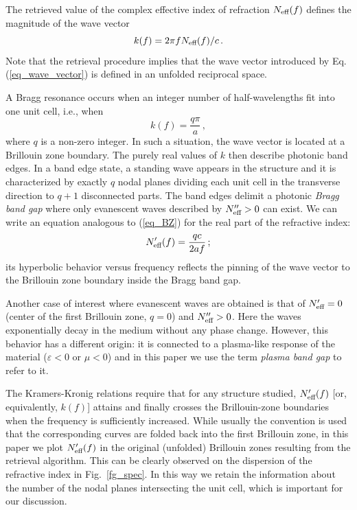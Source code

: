 {The retrieved value of the complex effective index of refraction $N_{\text{eff} }(f)$ 
defines the
magnitude of the wave vector
\begin{equation}\label{eq_wave_vector}
k(f) = 2\pi f N_{\text{eff} }(f) /c\,.
\end{equation}
Note that the retrieval procedure  implies that 
the wave vector
introduced by Eq. (\ref{eq_wave_vector}) is defined in an unfolded reciprocal 
space. 

A Bragg resonance occurs when an integer number of half-wavelengths fit into one 
unit cell, i.e.,  when
\begin{equation}\label{eq_BZ}
k(f) = \frac{q \pi}{a}\,,
\end{equation}
where $q$ is a non-zero integer. In such a situation, the wave vector is located at a
Brillouin zone boundary. The purely real values of $k$ then describe photonic band edges.
In a band edge state, a standing wave appears in the structure and it is characterized by
exactly $q$ nodal planes dividing each unit cell in the transverse direction to $q+1$
disconnected parts. The band edges delimit a photonic {\itshape Bragg band gap} where
only evanescent waves described by $N_{\text{eff} }''>0$ can exist.
We can write an equation analogous to (\ref{eq_BZ}) for the real part of the refractive
index:
\begin{equation}\label{eq_BZN}
N_{\text{eff} }'(f) = \frac{q c}{2 a f}\,;
\end{equation}
its hyperbolic behavior versus frequency reflects the pinning of the wave vector to the
Brillouin zone boundary inside the Bragg band gap.

Another case of interest where evanescent waves are obtained is that of $N_{\text{eff} }' = 0$
(center of the first Brillouin zone, $q=0$) and $N_{\text{eff} }''>0$. Here the waves exponentially
decay in the medium without any phase change. However, this behavior has a different
origin: it is connected to a plasma-like response of the material ($\varepsilon<0$ or
$\mu<0$) and in this paper we use the term \textit{plasma band gap} to refer to it.

The Kramers-Kronig relations require that for any structure studied, $N_{\text{eff} }'(f)$ [or,
equivalently, $k(f)$] attains and finally crosses the Brillouin-zone boundaries when the
frequency is sufficiently increased. While usually the convention is used that the
corresponding curves are folded back into the first Brillouin zone, in this paper we plot
$N_{\text{eff} }'(f)$ in the original (unfolded) Brillouin zones resulting from the retrieval
algorithm. This can be clearly observed on the dispersion of the refractive index in
Fig.\ \ref{fg_spec}. In this way we retain the information about the number of the nodal
planes intersecting the unit cell, which is important for our discussion.

}
